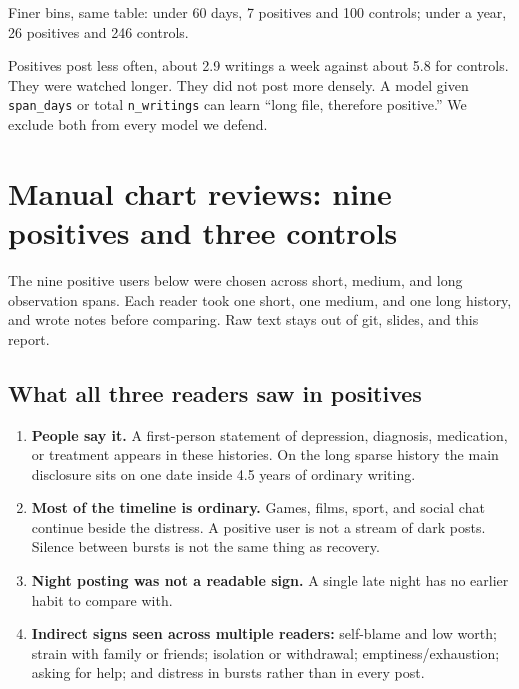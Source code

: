 \documentclass[11pt,a4paper]{article}
\begin{document}
Finer bins, same table: under 60 days, 7 positives and 100 controls; under a year, 26 positives and 246 controls.

Positives post less often, about 2.9 writings a week against about 5.8 for controls. They were watched longer. They did not post more densely. A model given \texttt{span\_days} or total \texttt{n\_writings} can learn ``long file, therefore positive.'' We exclude both from every model we defend.

\section{Manual chart reviews: nine positives and three controls}
The nine positive users below were chosen across short, medium, and long observation spans. Each reader took one short, one medium, and one long history, and wrote notes before comparing. Raw text stays out of git, slides, and this report.

\subsection{What all three readers saw in positives}
\begin{enumerate}[nosep]
\item \textbf{People say it.} A first-person statement of depression, diagnosis, medication, or treatment appears in these histories. On the long sparse history the main disclosure sits on one date inside 4.5 years of ordinary writing.
\item \textbf{Most of the timeline is ordinary.} Games, films, sport, and social chat continue beside the distress. A positive user is not a stream of dark posts. Silence between bursts is not the same thing as recovery.
\item \textbf{Night posting was not a readable sign.} A single late night has no earlier habit to compare with.
\item \textbf{Indirect signs seen across multiple readers:} self-blame and low worth; strain with family or friends; isolation or withdrawal; emptiness/exhaustion; asking for help; and distress in bursts rather than in every post.
\end{enumerate}
\end{document}
